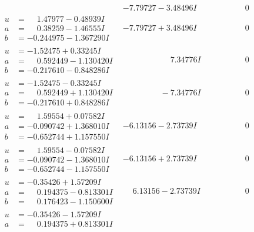 \documentclass[1p]{elsarticle_modified}
\theoremstyle{definition}
\begin{document}
$$\begin{array}{c|c|c}
 & -7.79727 - 3.48496 I & \phantom{-0.000000 } 0 \\ \hline\begin{aligned}
u &= \phantom{-}1.47977 - 0.48939 I \\
a &= \phantom{-}0.38259 - 1.46555 I \\
b &= -0.244975 - 1.367290 I\end{aligned}
 & -7.79727 + 3.48496 I & \phantom{-0.000000 } 0 \\ \hline\begin{aligned}
u &= -1.52475 + 0.33245 I \\
a &= \phantom{-}0.592449 - 1.130420 I \\
b &= -0.217610 - 0.848286 I\end{aligned}
 & \phantom{-0.000000 -}7.34776 I & \phantom{-0.000000 } 0 \\ \hline\begin{aligned}
u &= -1.52475 - 0.33245 I \\
a &= \phantom{-}0.592449 + 1.130420 I \\
b &= -0.217610 + 0.848286 I\end{aligned}
 & \phantom{-0.000000 } -7.34776 I & \phantom{-0.000000 } 0 \\ \hline\begin{aligned}
u &= \phantom{-}1.59554 + 0.07582 I \\
a &= -0.090742 + 1.368010 I \\
b &= -0.652744 + 1.157550 I\end{aligned}
 & -6.13156 - 2.73739 I & \phantom{-0.000000 } 0 \\ \hline\begin{aligned}
u &= \phantom{-}1.59554 - 0.07582 I \\
a &= -0.090742 - 1.368010 I \\
b &= -0.652744 - 1.157550 I\end{aligned}
 & -6.13156 + 2.73739 I & \phantom{-0.000000 } 0 \\ \hline\begin{aligned}
u &= -0.35426 + 1.57209 I \\
a &= \phantom{-}0.194375 - 0.813301 I \\
b &= \phantom{-}0.176423 - 1.150600 I\end{aligned}
 & \phantom{-}6.13156 - 2.73739 I & \phantom{-0.000000 } 0 \\ \hline\begin{aligned}
u &= -0.35426 - 1.57209 I \\
a &= \phantom{-}0.194375 + 0.813301 I \\

\end{aligned}
\end{array}$$
\end{document}
